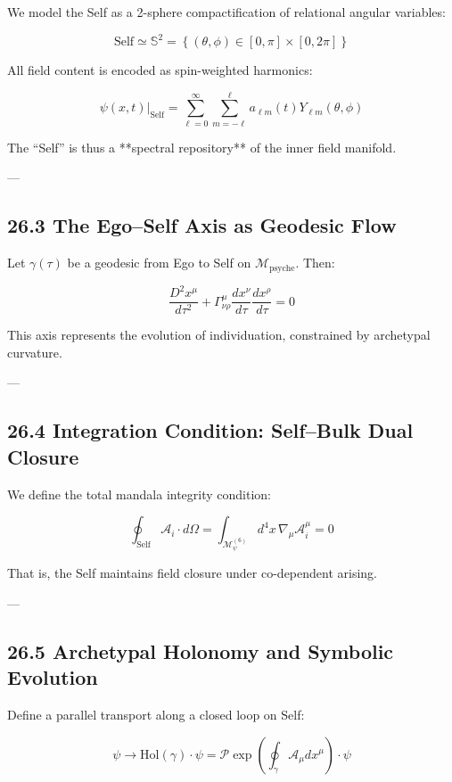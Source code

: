 \documentclass[12pt]{article}
\begin{document}
\begin{enumerate}
We model the Self as a 2-sphere compactification of relational angular variables:

\[
\text{Self} \simeq \mathbb{S}^2 = \left\{ (\theta, \phi) \in [0,\pi] \times [0,2\pi] \right\}
\]

All field content is encoded as spin-weighted harmonics:

\[
\psi(x,t) \big|_{\text{Self}} = \sum_{\ell=0}^\infty \sum_{m=-\ell}^{\ell} a_{\ell m}(t) Y_{\ell m}(\theta, \phi)
\]

The “Self” is thus a **spectral repository** of the inner field manifold.

---

\subsection*{26.3 The Ego–Self Axis as Geodesic Flow}

Let $\gamma(\tau)$ be a geodesic from Ego to Self on $\mathcal{M}_\text{psyche}$. Then:

\[
\frac{D^2 x^\mu}{d\tau^2} + \Gamma^\mu_{\nu\rho} \frac{dx^\nu}{d\tau} \frac{dx^\rho}{d\tau} = 0
\]

This axis represents the evolution of individuation, constrained by archetypal curvature.

---

\subsection*{26.4 Integration Condition: Self–Bulk Dual Closure}

We define the total mandala integrity condition:

\[
\oint_{\text{Self}} \mathcal{A}_i \cdot d\Omega = \int_{\mathcal{M}_\psi^{(6)}} d^4x \, \nabla_\mu \mathcal{A}_i^\mu = 0
\]

That is, the Self maintains field closure under co-dependent arising.

---

\subsection*{26.5 Archetypal Holonomy and Symbolic Evolution}

Define a parallel transport along a closed loop on Self:

\[
\psi \rightarrow \text{Hol}(\gamma) \cdot \psi = \mathcal{P} \exp\left( \oint_\gamma \mathcal{A}_\mu dx^\mu \right) \cdot \psi
\]


\end{enumerate}
\end{document}
